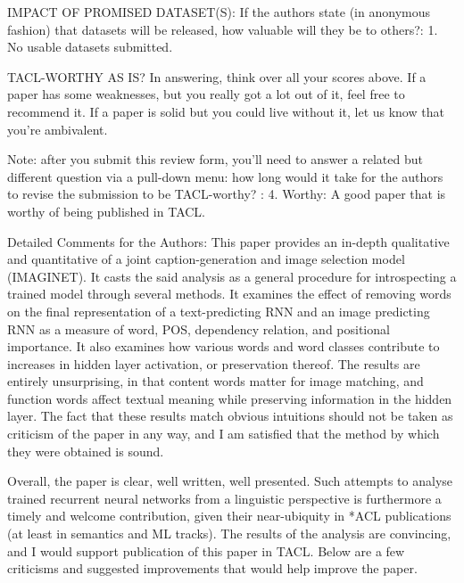 \documentclass[10pt,a4paper]{letter}
\begin{document}
IMPACT OF PROMISED DATASET(S): If the authors state (in anonymous fashion)
that datasets will be released, how valuable will they be to others?:
        1. No usable datasets submitted.


TACL-WORTHY AS IS? In answering, think over all your scores above. If a
paper has some weaknesses, but you really got a lot out of it, feel free to
recommend it. If a paper is solid but you could live without it, let us know
that you're ambivalent.

Note: after you submit this review form, you'll need to answer a related but
different question via a pull-down menu: how long would it take for the
authors to revise the submission to be TACL-worthy?
:
        4. Worthy: A good paper that is worthy of being published in TACL.

Detailed Comments for the Authors:
        This paper provides an in-depth qualitative and quantitative of a joint
caption-generation and image selection model (IMAGINET). It casts the said
analysis as a general procedure for introspecting a trained model through
several methods. It examines the effect of removing words on the final
representation of a text-predicting RNN and an image predicting RNN as a
measure of word, POS, dependency relation, and positional importance. It
also examines how various words and word classes contribute to increases in
hidden layer activation, or preservation thereof. The results are entirely
unsurprising, in that content words matter for image matching, and function
words affect textual meaning while preserving information in the hidden
layer. The fact that these results match obvious intuitions should not be
taken as criticism of the paper in any way, and I am satisfied that the
method by which they were obtained is sound.

Overall, the paper is clear, well written, well presented. Such attempts to
analyse trained recurrent neural networks from a linguistic perspective is
furthermore a timely and welcome contribution, given their near-ubiquity in
*ACL publications (at least in semantics and ML tracks). The results of the
analysis are convincing, and I would support publication of this paper in
TACL. Below are a few criticisms and suggested improvements that would help
improve the paper.
\end{document}

